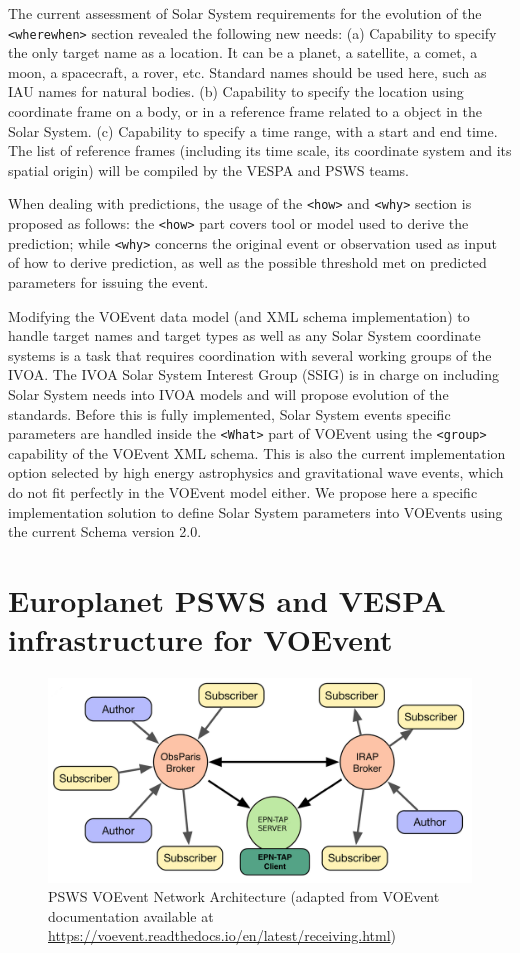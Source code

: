 \documentclass[referee,a4paper,12pt,traditabstract]{swsc}
\begin{document}
\begin{linenumbers}
The current assessment of Solar System requirements for the evolution of the {\tt <wherewhen>} section revealed the following new needs: (a) Capability to specify the only target name as a location. It can be a planet, a satellite, a comet, a moon, a spacecraft, a rover, etc. Standard names should be used here, such as IAU names for natural bodies. (b) Capability to specify the location using coordinate frame on a body, or in a reference frame related to a object in the Solar System. (c) Capability to specify a time range, with a start and end time. The list of reference frames (including its time scale, its coordinate system and its spatial origin) will be compiled by the VESPA and PSWS teams. 

When dealing with predictions, the usage of the {\tt <how>} and {\tt <why>} section is proposed as follows: the {\tt <how>} part covers tool or model used to derive the prediction; while {\tt <why>} concerns the original event or observation used as input of how to derive prediction, as well as the possible threshold met on predicted parameters for issuing the event.

Modifying the VOEvent data model (and XML schema implementation) to handle target names and target types as well as any Solar System coordinate systems is a task that requires coordination with several working groups of the IVOA. The IVOA Solar System Interest Group (SSIG) is in charge on including Solar System needs into IVOA models and will propose evolution of the standards. Before this is fully implemented, Solar System events specific parameters are handled inside the {\tt  <What>} part of VOEvent using the {\tt <group>} capability of the VOEvent XML schema. This is also the current implementation option selected by high energy astrophysics and gravitational wave events, which do not fit perfectly in the VOEvent model either. We propose here a specific implementation solution to define Solar System parameters into VOEvents using the current Schema version 2.0.

\section{Europlanet PSWS and VESPA infrastructure for VOEvent}

\begin{figure}
\centering\includegraphics[width=0.7\linewidth]{figure-psws-network.png}
\caption{PSWS VOEvent Network Architecture (adapted from VOEvent documentation available at \url{https://voevent.readthedocs.io/en/latest/receiving.html})}
\label{fig:architecture}
\end{figure}


\end{linenumbers}
\end{document}
